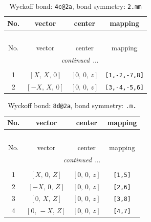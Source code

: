\documentclass[fleqn,8pt]{jsarticle}
\begin{document}
\renewcommand{\arraystretch}{1.2}
\begin{longtable}{cccc}
\caption{Wyckoff bond: {\tt 4c@2a}, bond symmetry: {\tt 2.mm}}
 \\
 \hline \hline
No. & vector & center & mapping \\ \hline \endfirsthead

\multicolumn{3}{l}{\tablename\ \thetable{}} \\
 \hline \hline
No. & vector & center & mapping \\ \hline \endhead

 \hline \hline
\multicolumn{3}{r}{\footnotesize\it continued ...} \\ \endfoot

 \hline \hline
\multicolumn{3}{r}{} \\ \endlastfoot

1 & $\left[ X,\, X,\, 0 \right]$ & $\left[ 0,\, 0,\, z \right]$ & {\tt [1,-2,-7,8]} \\ \hline
2 & $\left[ - X,\, X,\, 0 \right]$ & $\left[ 0,\, 0,\, z \right]$ & {\tt [3,-4,-5,6]} \\
\end{longtable}
\renewcommand{\arraystretch}{1.2}
\begin{longtable}{cccc}
\caption{Wyckoff bond: {\tt 8d@2a}, bond symmetry: {\tt .m.}}
 \\
 \hline \hline
No. & vector & center & mapping \\ \hline \endfirsthead

\multicolumn{3}{l}{\tablename\ \thetable{}} \\
 \hline \hline
No. & vector & center & mapping \\ \hline \endhead

 \hline \hline
\multicolumn{3}{r}{\footnotesize\it continued ...} \\ \endfoot

 \hline \hline
\multicolumn{3}{r}{} \\ \endlastfoot

1 & $\left[ X,\, 0,\, Z \right]$ & $\left[ 0,\, 0,\, z \right]$ & {\tt [1,5]} \\ \hline
2 & $\left[ - X,\, 0,\, Z \right]$ & $\left[ 0,\, 0,\, z \right]$ & {\tt [2,6]} \\ \hline
3 & $\left[ 0,\, X,\, Z \right]$ & $\left[ 0,\, 0,\, z \right]$ & {\tt [3,8]} \\ \hline
4 & $\left[ 0,\, - X,\, Z \right]$ & $\left[ 0,\, 0,\, z \right]$ & {\tt [4,7]} \\
\end{longtable}
\end{document}
